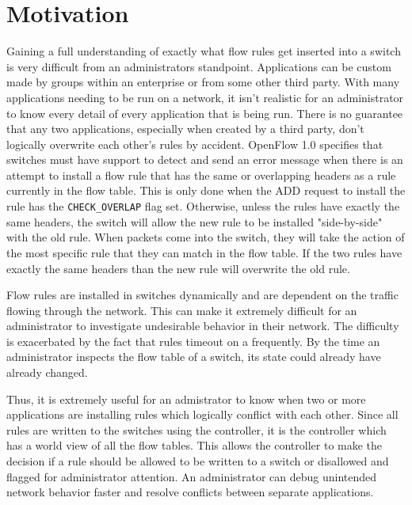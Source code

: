 \section{Motivation}
\label{sec:motivation}

Gaining a full understanding of exactly what flow rules get inserted into a switch is very difficult from an administrators standpoint.
Applications can be custom made by groups within an enterprise or from some other third party.
With many applications needing to be run on a network, it isn't realistic for an administrator to know every detail of every application that is being run.
There is no guarantee that any two applications, especially when created by a third party, don't logically overwrite each other's rules by accident.
OpenFlow 1.0 specifies that switches must have support to detect and send an error message when there is an attempt to install a flow rule that has the same or overlapping headers as a rule currently in the flow table.
This is only done when the ADD request to install the rule has the \texttt{CHECK\_OVERLAP} flag set.
Otherwise, unless the rules have exactly the same headers, the switch will allow the new rule to be installed "side-by-side" with the old rule.
When packets come into the switch, they will take the action of the most specific rule that they can match in the flow table.
If the two rules have exactly the same headers than the new rule will overwrite the old rule.

Flow rules are installed in switches dynamically and are dependent on the traffic flowing through the network.
This can make it extremely difficult for an administrator to investigate undesirable behavior in their network.
The difficulty is exacerbated by the fact that rules timeout on a frequently.
By the time an administrator inspects the flow table of a switch, its state could already have already changed.

Thus, it is extremely useful for an admistrator to know when two or more applications are installing rules which logically conflict with each other.
Since all rules are written to the switches using the controller, it is the controller which has a world view of all the flow tables.
This allows the controller to make the decision if a rule should be allowed to be written to a switch or disallowed and flagged for administrator attention.
An administrator can debug unintended network behavior faster and resolve conflicts between separate applications.

